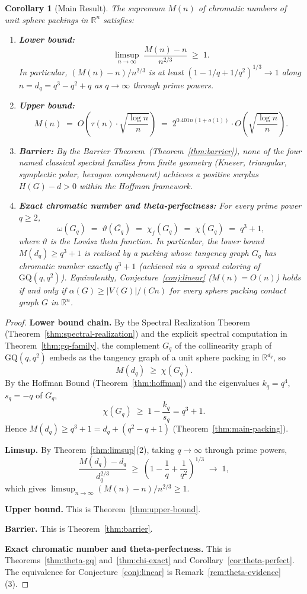 \documentclass{article}
\newtheorem{corollary}[theorem]{Corollary}
\theoremstyle{definition}
\begin{document}
\begin{corollary}[Main Result]\label{cor:main}
The supremum $M(n)$ of chromatic numbers of unit sphere packings in $\mathbb{R}^n$ satisfies:
\begin{enumerate}
\item[\textup{(i)}] \textbf{Lower bound:}
\[
  \limsup_{n\to\infty}\;\frac{M(n)-n}{n^{2/3}}\;\ge\;1.
\]
In particular, $(M(n)-n)/n^{2/3}$ is at least $(1-1/q+1/q^2)^{1/3}\to 1$ along $n=d_q=q^3-q^2+q$ as $q\to\infty$ through prime powers.
\item[\textup{(ii)}] \textbf{Upper bound:}
\[
  M(n)\;=\;O\!\left(\tau(n)\cdot\sqrt{\frac{\log n}{n}}\right)
  \;=\;2^{0.401n(1+o(1))}\cdot O\!\left(\sqrt{\frac{\log n}{n}}\right).
\]
\item[\textup{(iii)}] \textbf{Barrier:} By the Barrier Theorem~\textup{(Theorem~\ref{thm:barrier})}, none of the four named classical spectral families from finite geometry (Kneser, triangular, symplectic polar, hexagon complement) achieves a positive surplus $H(G)-d>0$ within the Hoffman framework.
\item[\textup{(iv)}] \textbf{Exact chromatic number and theta-perfectness:} For every prime power $q\ge 2$,
\[
  \omega(G_q) \;=\; \vartheta(\overline{G_q}) \;=\; \chi_f(G_q) \;=\; \chi(G_q) \;=\; q^3+1,
\]
where $\vartheta$ is the Lov\'asz theta function.  In particular, the lower bound $M(d_q)\ge q^3+1$ is realised by a packing whose tangency graph $G_q$ has chromatic number exactly $q^3+1$ (achieved via a spread coloring of $\mathrm{GQ}(q,q^2)$).  Equivalently, Conjecture~\ref{conj:linear} ($M(n)=O(n)$) holds if and only if $\alpha(G)\ge |V(G)|/(Cn)$ for every sphere packing contact graph $G$ in $\mathbb{R}^n$.
\end{enumerate}
\end{corollary}

\begin{proof}
\textbf{Lower bound chain.}
By the Spectral Realization Theorem (Theorem~\ref{thm:spectral-realization}) and the explicit spectral computation in Theorem~\ref{thm:gq-family}, the complement $G_q$ of the collinearity graph of $\mathrm{GQ}(q,q^2)$ embeds as the tangency graph of a unit sphere packing in $\mathbb{R}^{d_q}$, so
\[
M(d_q)\;\ge\;\chi(G_q).
\]
By the Hoffman Bound (Theorem~\ref{thm:hoffman}) and the eigenvalues $k_q=q^4$, $s_q=-q$ of $G_q$,
\[
\chi(G_q)\;\ge\;1-\frac{k_q}{s_q}=q^3+1.
\]
Hence $M(d_q)\ge q^3+1 = d_q+(q^2-q+1)$ (Theorem~\ref{thm:main-packing}).

\textbf{Limsup.}
By Theorem~\ref{thm:limsup}(2), taking $q\to\infty$ through prime powers,
\[
\frac{M(d_q)-d_q}{d_q^{2/3}}\;\ge\;\left(1-\frac{1}{q}+\frac{1}{q^2}\right)^{1/3}\;\to\;1,
\]
which gives $\limsup_{n\to\infty}(M(n)-n)/n^{2/3}\ge 1$.

\textbf{Upper bound.}  This is Theorem~\ref{thm:upper-bound}.

\textbf{Barrier.}  This is Theorem~\ref{thm:barrier}.

\textbf{Exact chromatic number and theta-perfectness.}  This is Theorems~\ref{thm:theta-gq} and~\ref{thm:chi-exact} and Corollary~\ref{cor:theta-perfect}.  The equivalence for Conjecture~\ref{conj:linear} is Remark~\ref{rem:theta-evidence}(3).
\end{proof}
\end{document}
